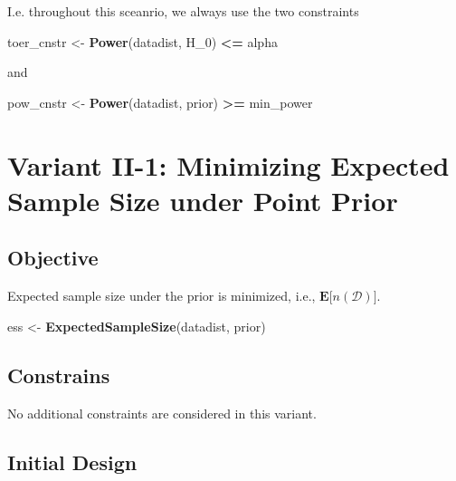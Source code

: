 \documentclass[]{book}
\newenvironment{Shaded}{\begin{snugshade}}{\end{snugshade}}
\newcommand{\DecValTok}[1]{\textcolor[rgb]{0.00,0.00,0.81}{#1}}
\newcommand{\KeywordTok}[1]{\textcolor[rgb]{0.13,0.29,0.53}{\textbf{#1}}}
\newcommand{\NormalTok}[1]{#1}
\newcommand{\OperatorTok}[1]{\textcolor[rgb]{0.81,0.36,0.00}{\textbf{#1}}}
\newcommand{\StringTok}[1]{\textcolor[rgb]{0.31,0.60,0.02}{#1}}
\begin{document}
I.e. throughout this sceanrio, we always use the two
constraints

\begin{Shaded}
\begin{Highlighting}[]
\NormalTok{toer_cnstr <-}\StringTok{ }\KeywordTok{Power}\NormalTok{(datadist, H_}\DecValTok{0}\NormalTok{) }\OperatorTok{<=}\StringTok{ }\NormalTok{alpha}
\end{Highlighting}
\end{Shaded}

and

\begin{Shaded}
\begin{Highlighting}[]
\NormalTok{pow_cnstr <-}\StringTok{ }\KeywordTok{Power}\NormalTok{(datadist, prior) }\OperatorTok{>=}\StringTok{ }\NormalTok{min_power}
\end{Highlighting}
\end{Shaded}

\hypertarget{variantII_1}{%
\section{Variant II-1: Minimizing Expected Sample Size under Point Prior}\label{variantII_1}}

\hypertarget{objective-3}{%
\subsection{Objective}\label{objective-3}}

Expected sample size under the prior is minimized, i.e.,
\(\boldsymbol{E}\big[n(\mathcal{D})\big]\).

\begin{Shaded}
\begin{Highlighting}[]
\NormalTok{ess <-}\StringTok{ }\KeywordTok{ExpectedSampleSize}\NormalTok{(datadist, prior)}
\end{Highlighting}
\end{Shaded}

\hypertarget{constrains-3}{%
\subsection{Constrains}\label{constrains-3}}

No additional constraints are considered in this variant.

\hypertarget{initial-design-2}{%
\subsection{Initial Design}\label{initial-design-2}}
\end{document}
